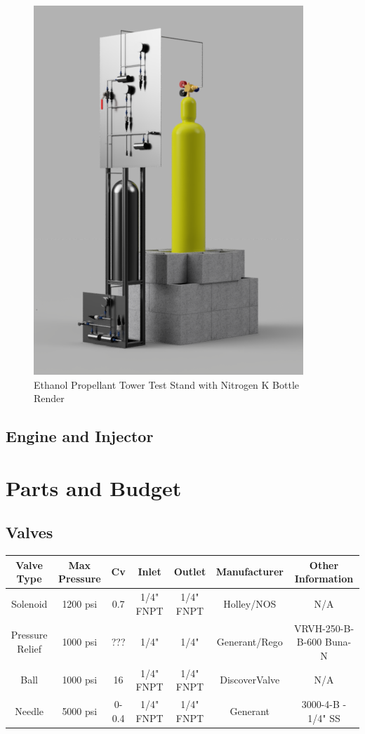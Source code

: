 \documentclass[9pt]{article} %
\numberwithin{equation}{section} %
\begin{document}
\begin{figure}[!htb] 
    \centering
    \includegraphics[scale=2]{master_stand_overall_render_2.png} %
    \caption{Ethanol Propellant Tower Test Stand with Nitrogen K Bottle Render}
    \label{fig:ethanol_tank_stand_with_nitrogen_render}
\end{figure}

\subsection{Engine and Injector}

\section{Parts and Budget}

\subsection{Valves}
\begin{center}
 \begin{tabular}{||c c c c c c c||} 
 \hline
 Valve Type & Max Pressure & Cv & Inlet & Outlet & Manufacturer & Other Information\\
 \hline\hline
 Solenoid & 1200 psi & 0.7 & 1/4" FNPT & 1/4" FNPT & Holley/NOS & N/A\\ 
 \hline
 Pressure Relief & 1000 psi & ??? & 1/4" & 1/4" & Generant/Rego & VRVH-250-B-B-600 Buna-N\\
 \hline
 Ball & 1000 psi & 16 & 1/4" FNPT & 1/4" FNPT & DiscoverValve & N/A\\
 \hline
 Needle & 5000 psi & 0-0.4 & 1/4" FNPT & 1/4" FNPT & Generant & 3000-4-B - 1/4" SS\\ [0.5ex]
 \hline
\end{tabular}
\end{center}
\end{document}
